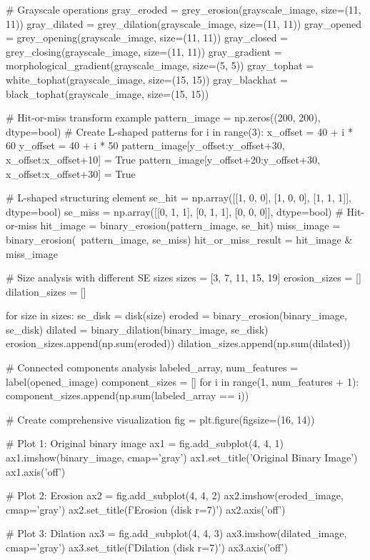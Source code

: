\documentclass[a4paper, 11pt]{article}
\begin{document}
\begin{pycode}
# Grayscale operations
gray_eroded = grey_erosion(grayscale_image, size=(11, 11))
gray_dilated = grey_dilation(grayscale_image, size=(11, 11))
gray_opened = grey_opening(grayscale_image, size=(11, 11))
gray_closed = grey_closing(grayscale_image, size=(11, 11))
gray_gradient = morphological_gradient(grayscale_image, size=(5, 5))
gray_tophat = white_tophat(grayscale_image, size=(15, 15))
gray_blackhat = black_tophat(grayscale_image, size=(15, 15))

# Hit-or-miss transform example
pattern_image = np.zeros((200, 200), dtype=bool)
# Create L-shaped patterns
for i in range(3):
    x_offset = 40 + i * 60
    y_offset = 40 + i * 50
    pattern_image[y_offset:y_offset+30, x_offset:x_offset+10] = True
    pattern_image[y_offset+20:y_offset+30, x_offset:x_offset+30] = True

# L-shaped structuring element
se_hit = np.array([[1, 0, 0],
                   [1, 0, 0],
                   [1, 1, 1]], dtype=bool)
se_miss = np.array([[0, 1, 1],
                    [0, 1, 1],
                    [0, 0, 0]], dtype=bool)
# Hit-or-miss
hit_image = binary_erosion(pattern_image, se_hit)
miss_image = binary_erosion(~pattern_image, se_miss)
hit_or_miss_result = hit_image & miss_image

# Size analysis with different SE sizes
sizes = [3, 7, 11, 15, 19]
erosion_sizes = []
dilation_sizes = []

for size in sizes:
    se_disk = disk(size)
    eroded = binary_erosion(binary_image, se_disk)
    dilated = binary_dilation(binary_image, se_disk)
    erosion_sizes.append(np.sum(eroded))
    dilation_sizes.append(np.sum(dilated))

# Connected components analysis
labeled_array, num_features = label(opened_image)
component_sizes = []
for i in range(1, num_features + 1):
    component_sizes.append(np.sum(labeled_array == i))

# Create comprehensive visualization
fig = plt.figure(figsize=(16, 14))

# Plot 1: Original binary image
ax1 = fig.add_subplot(4, 4, 1)
ax1.imshow(binary_image, cmap='gray')
ax1.set_title('Original Binary Image')
ax1.axis('off')

# Plot 2: Erosion
ax2 = fig.add_subplot(4, 4, 2)
ax2.imshow(eroded_image, cmap='gray')
ax2.set_title(f'Erosion (disk r={7})')
ax2.axis('off')

# Plot 3: Dilation
ax3 = fig.add_subplot(4, 4, 3)
ax3.imshow(dilated_image, cmap='gray')
ax3.set_title(f'Dilation (disk r={7})')
ax3.axis('off')


\end{pycode}
\end{document}
